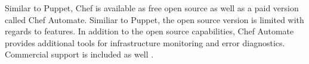 Similar to Puppet, Chef is available as free open source as well as a paid version called Chef Automate. Similiar to Puppet, the open source version is limited with regards to features. In addition to the open source capabilities, Chef Automate provides additional tools for  infrastructure monitoring and error diagnostics. Commercial support is included as well \cite{chefiodatasheet}.


